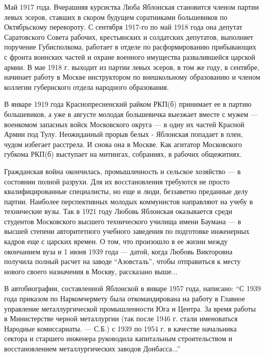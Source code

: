 Май 1917 года. Вчерашняя курсистка Люба Яблонская становится членом партии
левых эсеров, ставших в скором будущем соратниками большевиков по Октябрьскому
перевороту. С сентября 1917-го по май 1918 года она депутат Саратовского Совета
рабочих, крестьянских и солдатских депутатов, выполняет поручение Губисполкома,
работает в отделе по расформированию прибывающих с фронта воинских частей и
охране военного имущества развалившейся царской армии. В мае 1918 г. выходит из
партии левых эсеров, в том же году, в сентябре, начинает работу в Москве
инструктором по внешкольному образованию и членом коллегии губернского отдела
народного образования.

В январе 1919 года Краснопресненский райком РКП(б) принимает ее в партию
большевиков, а уже в августе молодая большевичка выезжает вместе с мужем —
военкомом запасных войск Московского округа — в одну их частей Красной Армии
под Тулу. Неожиданный прорыв белых - Яблонская попадает в плен, чудом избегает
расстрела. И снова она в Москве. Как агитатор Московского губкома РКП(б)
выступает на митингах, собраниях, в рабочих общежитиях.

Гражданская война окончилась, промышленность и сельское хозяйство — в состоянии
полной разрухи. Для их восстановления требуются не просто квалифицированные
специалисты, но еще и люди, беззаветно преданные делу партии. Наиболее
перспективных молодых коммунистов направляют на учебу в технические вузы. Так в
1921 году Любовь Яблонская оказывается среди студентов Московского высшего
технического училища имени Баумана — в высшей степени авторитетного учебного
заведения по подготовке инженерных кадров еще с царских времен. О том, что
произошло в ее жизни между окончанием вуза и 1 июня 1939 года — датой, когда
Любовь Викторовна получила полный расчет на заводе \enquote{Азовсталь}, чтобы
отправиться к месту нового своего назначения в Москву, рассказано выше...

В автобиографии, составленной Яблонской в январе 1957 года, написано: \enquote{С 1939
года приказом по Наркомчермету была откомандирована на работу в Главное
управление металлургической промышленности Юга и Центра. За время работы в
Министерстве черной металлургии (так после 1946 г. стали именоваться Народные
комиссариаты. — С.Б.) с 1939 по 1954 г. в качестве начальника сектора и
старшего инженера руководила капитальным строительством и восстановлением
металлургических заводов Донбасса...}

